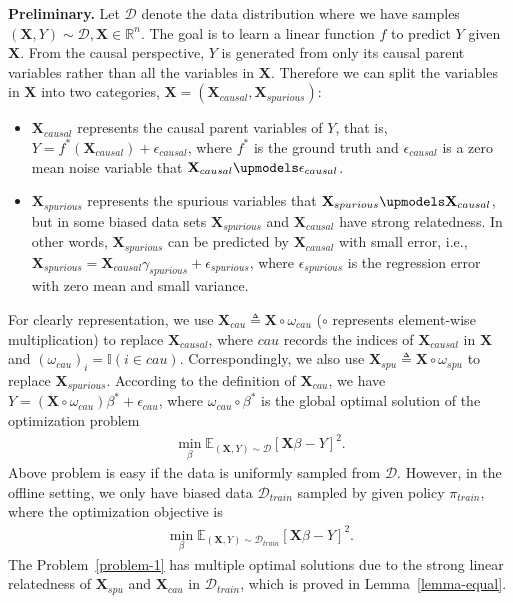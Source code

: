\documentclass{article}
\theoremstyle{plain}
\theoremstyle{definition}
\theoremstyle{remark}
\begin{document}
\textbf{Preliminary.}
Let $\mathcal{D}$ denote the data distribution where we have samples $(\textbf{X},Y)\sim \mathcal{D}, \textbf{X}\in\mathbb{R}^n$. 
The goal is to learn a linear function $f$ to predict $Y$ given $\textbf{X}$.
From the causal perspective, $Y$ is generated from only its causal parent variables rather than all the variables in $\textbf{X}$. 
Therefore we can split the variables in $\textbf{X}$ into two categories, $\textbf{X}=(\textbf{X}_{causal},\textbf{X}_{spurious})$:
\begin{itemize}[leftmargin=5mm]
    \item  $\textbf{X}_{causal}$ represents the causal parent variables of $Y$, that is, $Y=f^*(\textbf{X}_{causal})+\epsilon_{causal}$, where $f^*$ is the ground truth and $\epsilon_{causal}$ is a zero mean noise variable that $\textbf{X}_{causal} \upmodels \epsilon_{causal}$.
    \item $\textbf{X}_{spurious}$ represents the spurious variables that $\textbf{X}_{spurious}\upmodels \textbf{X}_{causal}$, but in some biased data sets $\textbf{X}_{spurious}$ and $\textbf{X}_{causal}$ have strong relatedness.
    In other words, $\textbf{X}_{spurious}$ can be predicted by $\textbf{X}_{causal}$ with small error, i.e., $\textbf{X}_{spurious}=\textbf{X}_{causal}\gamma_{spurious}+\epsilon_{spurious}$, where $\epsilon_{spurious}$ is the regression error with zero mean and small variance.
\end{itemize}

For clearly representation, we use $\textbf{X}_{cau}\triangleq\textbf{X}\circ\omega_{cau}$  ($\circ$ represents element-wise multiplication) to replace $\textbf{X}_{causal}$, where $cau$ records the indices of $\textbf{X}_{causal}$ in $\textbf{X}$ and  $(\omega_{cau})_i=\mathbb{I}(i\in cau)$. 
Correspondingly, we also use $\textbf{X}_{spu}\triangleq\textbf{X}\circ\omega_{spu}$ to replace $\textbf{X}_{spurious}$.
According to the definition of $\textbf{X}_{cau}$, we have $Y=(\textbf{X}\circ\omega_{cau})\beta^*+\epsilon_{cau}$, where $\omega_{cau}\circ\beta^*$ is the global optimal solution of the optimization problem
\begin{align}
\min_{\beta} \mathbb{E}_{(\textbf{X},Y)\sim\mathcal{D}}[\textbf{X}\beta-Y]^2.
\label{problem-0}
\end{align}
Above problem is easy if the data is uniformly sampled from $\mathcal{D}$.
However, in the offline setting, we only have biased data $\mathcal{D}_{train}$ sampled by given policy $\pi_{train}$, where the optimization objective is 
\begin{align}
    \min_{\beta} \mathbb{E}_{(\textbf{X},Y)\sim\mathcal{D}_{train}}[\textbf{X}\beta-Y]^2. 
    \label{problem-1}
\end{align}
The Problem~\ref{problem-1} has multiple optimal solutions due to the strong linear relatedness of $\textbf{X}_{spu}$ and $\textbf{X}_{cau}$ in $\mathcal{D}_{train}$, which is proved in Lemma~\ref{lemma-equal}.
\end{document}

